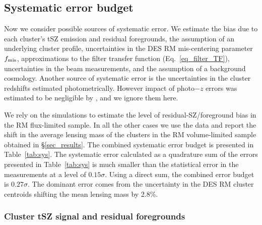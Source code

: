 \subsection{Systematic error budget}\label{sec_sys_checks}

Now we consider possible sources of systematic error. %
 We estimate the bias due to each cluster's tSZ emission and residual foregrounds, the assumption of an underlying cluster profile, uncertainties in the DES RM mis-centering parameter $f_{\rm mis}$, approximations to the filter transfer function (Eq.~\ref{eq_filter_TF}), uncertainties in the beam measurements, and the assumption of a background cosmology.
Another source of systematic error is the uncertainties in the cluster redshifts estimated photometrically.
However impact of photo$-z$ errors was estimated to be negligible by , and we ignore them here.

We rely on the  simulations to estimate the level of residual-SZ/foreground bias in the RM \whichyear{} flux-limited sample.
In all the other cases we use the data and report the shift in the average lensing mass of the clusters in the RM \whichyear{} volume-limited sample obtained in \S\ref{sec_results}. %
The combined systematic error budget is presented in Table~\ref{tab:sys}.
The systematic error calculated as a quadrature sum of the errors presented in Table~\ref{tab:sys} is much smaller than the statistical error in the measurements at a level of $0.15\sigma$. 
Using a direct sum, the combined error budget is $0.27\sigma$.
The dominant error comes from the uncertainty in the DES RM cluster centroids shifting the mean lensing mass by 2.8\%. 


\subsubsection{Cluster tSZ signal and residual foregrounds}\label{subsec_tszbias}


